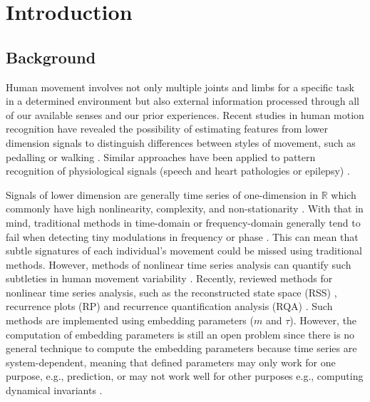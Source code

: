 
\chapter{Introduction} \label{chapter1}


\graphicspath{{figs/chapter1/PDF/}}

\section{Background}
Human movement involves not only multiple
joints and limbs for a specific task in a determined environment
but also external information processed through all of our available 
senses and our prior experiences. 
Recent studies in human motion recognition have revealed the possibility 
of estimating features from lower dimension signals to distinguish 
differences between styles of movement, such as pedalling 
\citep{Quintana-Duque2012, Quintana-Duque2016} or walking 
\citep{sama2013, frank2010}. 
Similar approaches have been applied to pattern recognition of 
physiological signals (speech and heart pathologies or epilepsy) 
\citep{gomezgarcia2014}.

Signals of lower dimension are generally time series 
of one-dimension in $\mathbb{R}$ which commonly have high nonlinearity, 
complexity, and non-stationarity 
\citep{gomezgarcia2014, huffaker2017, caballero2014}.
With that in mind, traditional methods in time-domain or 
frequency-domain generally tend to fail when detecting 
tiny modulations in frequency or phase \citep{marwan2011}. 
This can mean that subtle signatures of each 
individual's movement could be missed using traditional methods. 
However, methods of nonlinear time series analysis 
can quantify such subtleties in human movement variability 
\citep{Quintana-Duque2012, Quintana-Duque2016, sama2013, 
frank2010, gomezgarcia2014, marwan2011, stergiou2011, packard1980}.
Recently, \cite{bradley2015} reviewed methods for
nonlinear time series analysis, such as the reconstructed state space 
(RSS) \citep{takens1981}, recurrence plots (RP) \citep{eckmann1987} and
recurrence quantification analysis (RQA) \citep{zbilut1992}.
Such methods are implemented using embedding parameters ($m$ and $\tau$).
However, the computation of embedding parameters is still an open problem
since there is no general technique to compute the embedding parameters 
because time series are system-dependent, meaning that defined parameters
may only work for one purpose, e.g., prediction, or may not work well 
for other purposes e.g., computing dynamical invariants \citep{bradley2015}.

